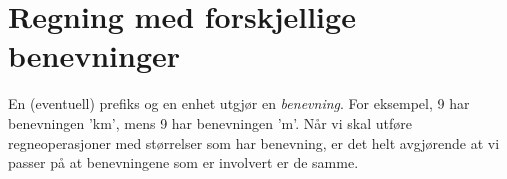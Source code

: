 \section{Regning med forskjellige benevninger}
En (eventuell) prefiks og en enhet utgjør en \textit{benevning}. For eksempel, 9 har benevningen 'km', mens 9 har benevningen 'm'. Når vi skal utføre regneoperasjoner med størrelser som har benevning, er det helt avgjørende at vi passer på at benevningene som er involvert er de samme.

